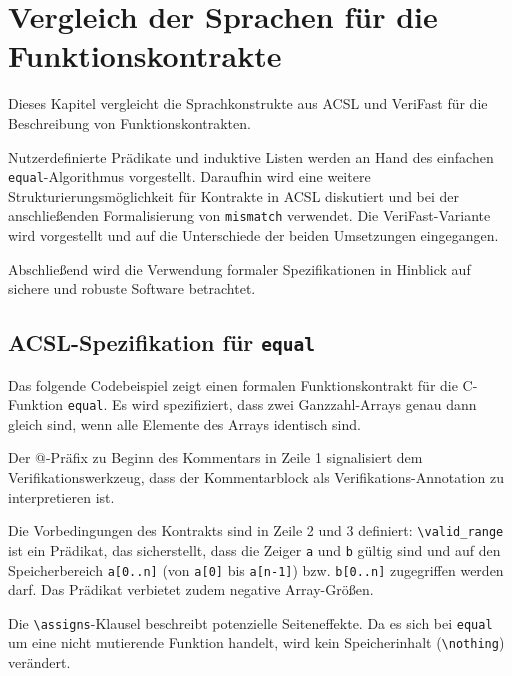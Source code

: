 ﻿\chapter{Vergleich der Sprachen für die Funktionskontrakte}
\label{sec:design-by-contract}

Dieses Kapitel vergleicht die Sprachkonstrukte aus ACSL und VeriFast für die Beschreibung von Funktionskontrakten.

Nutzerdefinierte Prädikate und induktive Listen werden an Hand des einfachen \texttt{equal}-Algorithmus vorgestellt.
Daraufhin wird eine weitere Strukturierungsmöglichkeit für Kontrakte in ACSL diskutiert und bei der anschließenden
Formalisierung von \texttt{mismatch} verwendet. Die VeriFast-Variante wird vorgestellt und auf die Unterschiede
der beiden Umsetzungen eingegangen. 

Abschließend wird die Verwendung formaler Spezifikationen in Hinblick auf sichere und robuste Software betrachtet.


\section{ACSL-Spezifikation für \texttt{equal}}
\label{sec:design-by-contract:acsl-spezifikation}

Das folgende Codebeispiel zeigt einen formalen Funktionskontrakt für die C-Funktion \texttt{equal}. Es wird
spezifiziert, dass zwei Ganzzahl-Arrays genau dann gleich sind, wenn alle Elemente des Arrays identisch sind.



Der @-Präfix zu Beginn des Kommentars in Zeile 1 signalisiert dem Verifikationswerkzeug, 
dass der Kommentarblock als Verifikations-Annotation zu interpretieren ist. 

Die Vorbedingungen des Kontrakts sind in Zeile 2 und 3 definiert: \lstinline{\valid_range} ist ein Prädikat, das sicherstellt,
dass die Zeiger \lstinline{a} und \lstinline{b} gültig sind und auf den Speicherbereich \lstinline{a[0..n]} 
(von \lstinline{a[0]} bis \lstinline{a[n-1]}) bzw. \lstinline{b[0..n]} zugegriffen 
werden darf. Das Prädikat verbietet zudem negative Array-Größen.

Die \lstinline{\assigns}-Klausel beschreibt potenzielle Seiteneffekte. Da es sich bei \texttt{equal} um eine nicht mutierende
Funktion handelt, wird kein Speicherinhalt (\lstinline{\nothing}) verändert.


